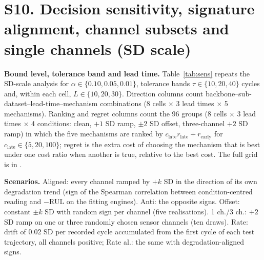 \documentclass[10pt,a4paper]{article}
\begin{document}
\section*{S10. Decision sensitivity, signature alignment, channel subsets and single channels (SD scale)}
\noindent\textbf{Bound level, tolerance band and lead time.} Table~\ref{tab:sens} repeats the SD-scale analysis for $\alpha\in\{0.10,0.05,0.01\}$, tolerance bands $\tau\in\{10,20,40\}$ cycles and, within each cell, $L\in\{10,20,30\}$. Direction columns count backbone--sub-dataset--lead-time--mechanism combinations (8 cells $\times$ 3 lead times $\times$ 5 mechanisms). Ranking and regret columns count the 96 groups (8 cells $\times$ 3 lead times $\times$ 4 conditions: clean, $+1$ SD ramp, $\pm2$ SD offset, three-channel $+2$ SD ramp) in which the five mechanisms are ranked by $c_{\mathrm{late}}r_{\mathrm{late}}+r_{\mathrm{early}}$ for $c_{\mathrm{late}}\in\{5,20,100\}$; regret is the extra cost of choosing the mechanism that is best under one cost ratio when another is true, relative to the best cost. The full grid is in .
\begin{table}[H]\centering\scriptsize
\caption{Stability of the direction pattern and of the cost ranking across bound level and tolerance band (heteroscedastic head for the premature range; all mechanisms for the counts).}\label{tab:sens}
\resizebox{\textwidth}{!}{}
\end{table}
\noindent\textbf{Scenarios.} Aligned: every channel ramped by $+k$ SD in the direction of its own degradation trend (sign of the Spearman correlation between condition-centred reading and $-$RUL on the fitting engines). Anti: the opposite signs. Offset: constant $\pm k$ SD with random sign per channel (five realisations). 1 ch./3 ch.: $+2$ SD ramp on one or three randomly chosen sensor channels (ten draws). Rate: drift of 0.02 SD per recorded cycle accumulated from the first cycle of each test trajectory, all channels positive; Rate al.: the same with degradation-aligned signs.
\begin{table}[H]\centering\scriptsize
\caption{Heteroscedastic head, $L=20$: premature / unrecognised (\% of evaluated engines) by scenario; numbers after the scenario name are SD.}\label{tab:scen}
\resizebox{\textwidth}{!}{}
\end{table}
\begin{table}[H]\centering\scriptsize
\caption{Channel subsets: premature triggers (\%, heteroscedastic head, $L=20$), median [minimum, maximum] over ten random draws of the perturbed channels.}\label{tab:subsets}

\end{table}
\end{document}
